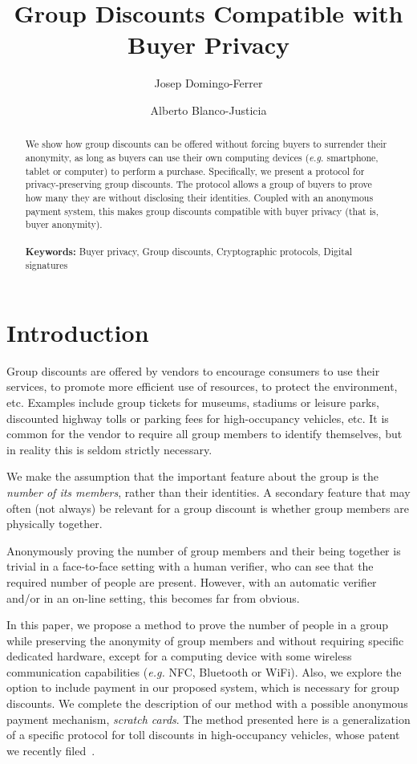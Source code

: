 \documentclass[11pt]{llncs}
\title{Group Discounts Compatible with Buyer Privacy}
\author{Josep Domingo-Ferrer \and Alberto Blanco-Justicia}
\institute{Universitat Rovira i Virgili\\
Dept. of Computer Engineering and Mathematics\\
UNESCO Chair in Data Privacy\\
Av. Pa\"{\i}sos Catalans 26\\
E-43007 Tarragona, Catalonia\\
\email{\{josep.domingo,alberto.blanco\}@urv.cat}}
\begin{document}
\maketitle

\begin{abstract}
We show how group discounts can be offered without
forcing buyers to surrender their anonymity, as long
as buyers can use
their own computing devices ({\em e.g.} smartphone, tablet or computer) to
perform a purchase. Specifically, we present a protocol for privacy-preserving
group discounts. The protocol allows a group of buyers to prove
how many they are without disclosing their identities. Coupled with
an anonymous payment system, this makes group discounts
compatible with buyer privacy (that is, buyer anonymity).\\
\\
\textbf{Keywords:} Buyer privacy, Group discounts, Cryptographic protocols,
Digital signatures
\end{abstract}

\section{Introduction}\label{ab.sec.intro}
Group discounts are offered by vendors to encourage
consumers to use their services, to promote more efficient
use of resources, to protect the environment, etc. Examples include
group tickets
for museums, stadiums or leisure parks, discounted highway tolls
or parking fees for high-occupancy
vehicles, etc.
It is common for the vendor to require all group members to identify
themselves, but in reality this is seldom strictly necessary.

We make the assumption that the important feature about the group is the
{\em number of its members}, rather than their identities.
A secondary feature that may often (not always) be relevant for
a group discount is whether group members are physically together.

Anonymously proving the number of group members
and their being together is trivial in a face-to-face setting
with a human verifier,
who can see that the required number of people are present.
However, with an automatic verifier and/or in an on-line setting,
this becomes far from obvious.

In this paper, we propose a method
to prove the number of people in a group while preserving
the anonymity of group members and without requiring
specific dedicated hardware, except for a computing device
with some wireless communication capabilities ({\em e.g.}
NFC, Bluetooth or WiFi).
Also, we explore the option to include payment in our proposed
system, which is necessary for group discounts.
We complete the description of our method with a possible
anonymous payment mechanism, \emph{scratch cards}.
The method presented here is a generalization of
a specific protocol for toll discounts in high-occupancy
vehicles, whose patent we recently filed~\cite{hov}.
\end{document}

